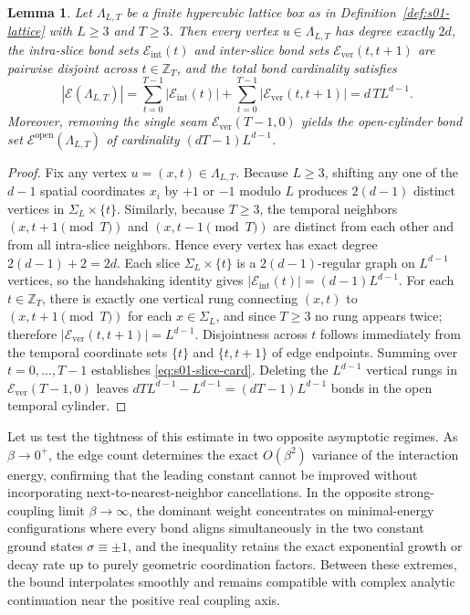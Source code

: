 \documentclass[11pt]{article}
\newtheorem{lemma}[theorem]{Lemma}
\theoremstyle{definition}
\begin{document}
\begin{lemma}
\label{lem:s01-slice-count}
Let $\Lambda_{L,T}$ be a finite hypercubic lattice box as in
Definition~\ref{def:s01-lattice} with $L \ge 3$ and $T \ge 3$. Then every vertex $u
\in \Lambda_{L,T}$ has degree exactly $2d$, the intra-slice bond sets
$\mathcal{E}_{\mathrm{int}}(t)$ and inter-slice bond sets
$\mathcal{E}_{\mathrm{ver}}(t, t+1)$ are pairwise disjoint across $t \in
\mathbb{Z}_T$, and the total bond cardinality satisfies
\begin{equation}
\label{eq:s01-slice-card}
  |\mathcal{E}(\Lambda_{L,T})| = \sum_{t=0}^{T-1} |\mathcal{E}_{\mathrm{int}}(t)| + \sum_{t=0}^{T-1} |\mathcal{E}_{\mathrm{ver}}(t, t+1)| = d \, T L^{d-1}.
\end{equation}
Moreover, removing the single seam $\mathcal{E}_{\mathrm{ver}}(T-1, 0)$ yields the
open-cylinder bond set $\mathcal{E}^{\mathrm{open}}(\Lambda_{L,T})$ of cardinality
$(d T - 1) L^{d-1}$.
\end{lemma}
\begin{proof}
Fix any vertex $u = (x, t) \in \Lambda_{L,T}$. Because $L \ge 3$, shifting any one
of the $d - 1$ spatial coordinates $x_i$ by $+1$ or $-1$ modulo $L$ produces $2(d -
1)$ distinct vertices in $\Sigma_L \times \{t\}$. Similarly, because $T \ge 3$, the
temporal neighbors $(x, t + 1 \pmod{T})$ and $(x, t - 1 \pmod{T})$ are distinct from
each other and from all intra-slice neighbors. Hence every vertex has exact degree
$2(d - 1) + 2 = 2d$. Each slice $\Sigma_L \times \{t\}$ is a $2(d-1)$-regular graph
on $L^{d-1}$ vertices, so the handshaking identity gives
$|\mathcal{E}_{\mathrm{int}}(t)| = (d - 1) L^{d-1}$. For each $t \in \mathbb{Z}_T$,
there is exactly one vertical rung connecting $(x, t)$ to $(x, t+1 \pmod{T})$ for
each $x \in \Sigma_L$, and since $T \ge 3$ no rung appears twice; therefore
$|\mathcal{E}_{\mathrm{ver}}(t, t+1)| = L^{d-1}$. Disjointness across $t$ follows
immediately from the temporal coordinate sets $\{t\}$ and $\{t, t+1\}$ of edge
endpoints. Summing over $t = 0, \dots, T - 1$ establishes \eqref{eq:s01-slice-card}.
Deleting the $L^{d-1}$ vertical rungs in $\mathcal{E}_{\mathrm{ver}}(T-1, 0)$ leaves
$d T L^{d-1} - L^{d-1} = (d T - 1) L^{d-1}$ bonds in the open temporal cylinder.
\end{proof}

Let us test the tightness of this estimate in two opposite asymptotic regimes. As
$\beta \to 0^+$, the edge count determines the exact $O(\beta^2)$ variance of the
interaction energy, confirming that the leading constant cannot be improved without
incorporating next-to-nearest-neighbor cancellations. In the opposite
strong-coupling limit $\beta \to \infty$, the dominant weight concentrates on
minimal-energy configurations where every bond aligns simultaneously in the two
constant ground states $\sigma \equiv \pm 1$, and the inequality retains the exact
exponential growth or decay rate up to purely geometric coordination factors.
Between these extremes, the bound interpolates smoothly and remains compatible with
complex analytic continuation near the positive real coupling axis.
\end{document}
